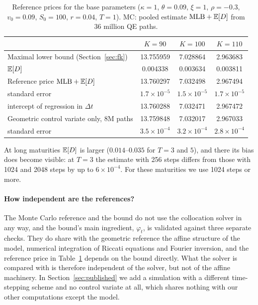 \begin{table}[t]
\centering
\caption{Reference prices for the base parameters ($\kappa=1$, $\theta=0.09$, $\xi=1$, $\rho=-0.3$,
$v_0=0.09$, $S_0=100$, $r=0.04$, $T=1$). MC: pooled estimate $\mathrm{MLB}+\mathbb{E}[D]$ from 36 million QE paths.}
\label{tab:ref}
\small
\begin{tabular}{lccc}
\toprule
& $K=90$ & $K=100$ & $K=110$\\
\midrule
Maximal lower bound (Section~\ref{sec:fk}) & 13.755959 & 7.028864 & 2.963683\\
$\mathbb{E}[D]$ & 0.004338 & 0.003634 & 0.003811\\
Reference price $\mathrm{MLB}+\mathbb{E}[D]$ & 13.760297 & 7.032498 & 2.967494\\
\quad standard error & $1.7\times10^{-5}$ & $1.5\times10^{-5}$ & $1.7\times10^{-5}$\\
\quad intercept of regression in $\Delta t$ & 13.760288 & 7.032471 & 2.967472\\
Geometric control variate only, 8M paths & 13.759848 & 7.032017 & 2.967033\\
\quad standard error & $3.5\times10^{-4}$ & $3.2\times10^{-4}$ & $2.8\times10^{-4}$\\
\bottomrule
\end{tabular}
\end{table}

At long maturities $\mathbb{E}[D]$ is larger ($0.014$--$0.035$ for $T=3$ and $5$), and there its bias does become
visible: at $T=3$ the estimate with 256 steps differs from those with 1024 and 2048 steps by up to
$6\times10^{-4}$. For these maturities we use 1024 steps or more.

\paragraph{How independent are the references?} The Monte Carlo reference and the bound do not use the
collocation solver in any way, and the bound's main ingredient, $\varphi_t$, is validated against three
separate checks. They do share with the geometric reference the affine structure of the model, numerical
integration of Riccati equations and Fourier inversion, and the reference price in Table~\ref{tab:ref}
depends on the bound directly. What the solver is compared with is therefore independent of the solver, but
not of the affine machinery. In Section~\ref{sec:published} we add a simulation with a different
time-stepping scheme and no control variate at all, which shares nothing with our other computations except
the model.
